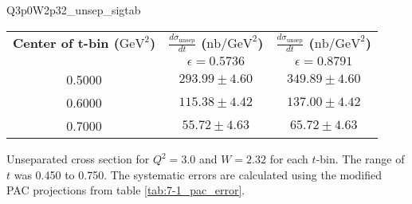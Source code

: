 \begin{Mtable}{Q3p0W2p32_unsep_sigtab}
  \centering
  \begin{tabular}{|c|c|c|}
    \hline
    \textbf{Center of t-bin ($\mathrm{GeV}^2$)} & \textbf{$\frac{d\sigma_{\mathrm{unsep}}}{dt}$ ($\mathrm{nb/GeV}^2$)} & \textbf{$\frac{d\sigma_{\mathrm{unsep}}}{dt}$ ($\mathrm{nb/GeV}^2$)} \\
    & $\epsilon=0.5736$ & $\epsilon=0.8791$ \\
    \hline
    0.5000 & $293.99\pm4.60$ & $349.89\pm4.60$\\
    0.6000 & $115.38\pm4.42$ & $137.00\pm4.42$\\
    0.7000 & $55.72\pm4.63$ & $65.72\pm4.63$\\
    \hline
  \end{tabular}
  \caption{Unseparated cross section for $Q^2=3.0$ and $W=2.32$ for each $t$-bin. The range of $t$ was 0.450 to 0.750. The systematic errors are calculated using the modified PAC projections from table \ref{tab:7-1_pac_error}.}
  \label{tab:Q3p0W2p32_unsep_sigtab}
\end{Mtable}

